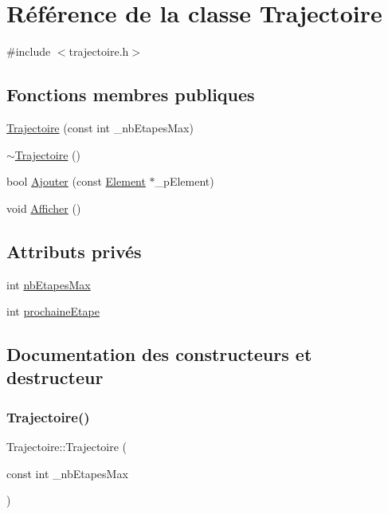 \hypertarget{class_trajectoire}{}\section{Référence de la classe Trajectoire}
\label{class_trajectoire}


{\ttfamily \#include $<$trajectoire.\+h$>$}

\subsection*{Fonctions membres publiques}
\begin{DoxyCompactItemize}
\item 
\hyperlink{class_trajectoire_a0703f0b87651b76f1e8744c9a3872205}{Trajectoire} (const int \+\_\+nb\+Etapes\+Max)
\item 
\hyperlink{class_trajectoire_a9249a7bd01726684494eeea9fde54b9e}{$\sim$\+Trajectoire} ()
\item 
bool \hyperlink{class_trajectoire_a12ae44f39805bb480c2f8bf3454ea342}{Ajouter} (const \hyperlink{class_element}{Element} $\ast$\+\_\+p\+Element)
\item 
void \hyperlink{class_trajectoire_ab2ab026cbcf416f397ff6ee7f8331cc4}{Afficher} ()
\end{DoxyCompactItemize}
\subsection*{Attributs privés}
\begin{DoxyCompactItemize}
\item 
int \hyperlink{class_trajectoire_a62cc9d5c52215094c7f0731e07cccbf5}{nb\+Etapes\+Max}
\item 
int \hyperlink{class_trajectoire_a56fb38e337100dcbc3c49727d8f68c6a}{prochaine\+Etape}
\end{DoxyCompactItemize}


\subsection{Documentation des constructeurs et destructeur}
\mbox{\label{class_trajectoire_a0703f0b87651b76f1e8744c9a3872205}} 
\subsubsection{\texorpdfstring{Trajectoire()}{Trajectoire()}}
{\footnotesize\ttfamily Trajectoire\+::\+Trajectoire (\begin{DoxyParamCaption}\item[{const int}]{\+\_\+nb\+Etapes\+Max }\end{DoxyParamCaption})}

